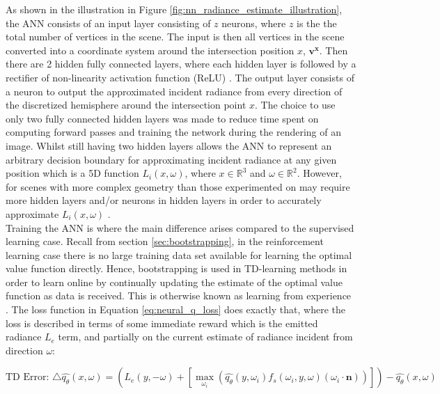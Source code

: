 \documentclass[../dissertation.tex]{subfiles}
\begin{document}
As shown in the illustration in Figure \ref{fig:nn_radiance_estimate_illustration}, the ANN consists of an input layer consisting of $z$ neurons, where $z$ is the the total number of vertices in the scene. The input is then all vertices in the scene converted into a coordinate system around the intersection position $x$, $\mathbf{v^x}$. Then there are 2 hidden fully connected layers, where each hidden layer is followed by a rectifier of non-linearity activation function (ReLU) \cite{nair2010rectified}. The output layer consists of a neuron to output the approximated incident radiance from every direction of the discretized hemisphere around the intersection point $x$. The choice to use only two fully connected hidden layers was made to reduce time spent on computing forward passes and training the network during the rendering of an image. Whilst still having two hidden layers allows the ANN to represent an arbitrary decision boundary for approximating incident radiance at any given position which is a 5D function $L_i(x, \omega)$, where $x \in \mathbb{R}^3$  and $\omega \in \mathbb{R}^2$. However, for scenes with more complex geometry than those experimented on may require more hidden layers and/or neurons in hidden layers in order to accurately approximate $L_i(x, \omega)$ \cite{ren2013global}.\\

Training the ANN is where the main difference arises compared to the supervised learning case. Recall from section \ref{sec:bootstrapping}, in the reinforcement learning case there is no large training data set available for learning the optimal value function directly. Hence, bootstrapping is used in TD-learning methods in order to learn online by continually updating the estimate of the optimal value function as data is received. This is otherwise known as learning from experience \cite{sutton2011reinforcement}. The loss function in Equation \ref{eq:neural_q_loss} does exactly that, where the loss is described in terms of some immediate reward which is the emitted radiance $L_e$ term, and partially on the current estimate of radiance incident from direction $\omega$:

$$\text{TD Error: } \triangle \hat{q_\theta}(x, \omega) = \left( L_e(y, -\omega) + \left[ \max_{\omega_i} \left(\hat{q_\theta}(y, \omega_i) f_s(\omega_i, y, \omega) (\omega_i \cdot \mathbf{n}) \right) \right] \right) - \hat{q_\theta}(x, \omega)$$
\end{document}
